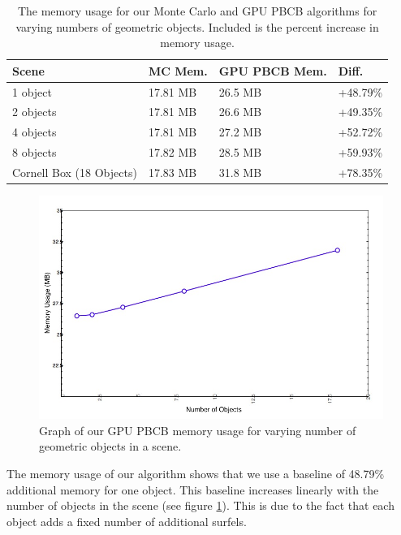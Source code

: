 \begin{table}[h!]
   \centering
   \begin{tabular}{ | l | l | l | l | }
   \hline
   \textbf{Scene} & \textbf{MC Mem.} & \textbf{GPU PBCB Mem.} & \textbf {Diff.} \\ \hline
   1 object & 17.81 MB & 26.5 MB & +48.79\% \\ \hline
   2 objects & 17.81 MB & 26.6 MB & +49.35\% \\ \hline
   4 objects & 17.81 MB & 27.2 MB & +52.72\% \\ \hline
   8 objects & 17.82 MB & 28.5 MB & +59.93\% \\ \hline
   Cornell Box (18 Objects) & 17.83 MB & 31.8 MB & +78.35\% \\ \hline
   \end{tabular}
   \captionfonts
   \caption[Memory usage]{The memory usage for our Monte Carlo and GPU PBCB algorithms for varying numbers of geometric objects. Included is the percent increase in memory usage.}
   \label{tbl:memory}
\end{table}

\begin{figure}[h!]
    \centering
    \includegraphics[width=150mm]{../img/memory.png}
    \caption[Memory Usage Graph]{Graph of our GPU PBCB memory usage for varying number of geometric objects in a scene.}
    \label{fig:memory_graph}
\end{figure}

The memory usage of our algorithm shows that we use a baseline of 48.79\% additional memory for one object. This baseline increases linearly with the number of objects in the scene (see figure \ref{fig:memory_graph}). This is due to the fact that each object adds a fixed number of additional surfels.

